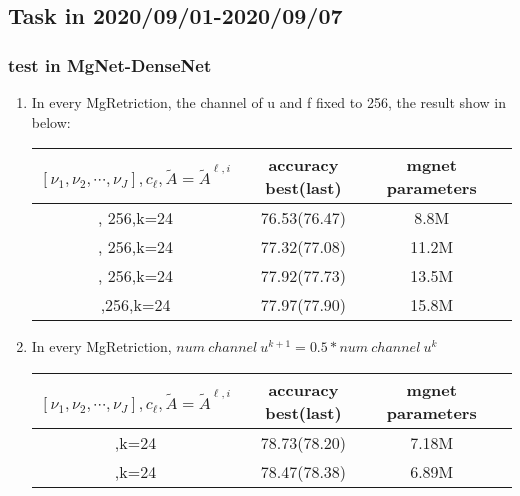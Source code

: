 \subsection{Task in 2020/09/01-2020/09/07}
\subsubsection{test in MgNet-DenseNet}
\begin{enumerate}
\item In every MgRetriction, the channel of u and f fixed to 256, the result show in below:
\begin{table}[!htbp]
	\begin{center}
			\begin{tabular}{|c|c|c|c|}
                \hline
				$[\nu_1,\nu_2,\cdots,\nu_J], c_\ell,\widetilde{A}=\widetilde{A}^{\ell,i}$   &  accuracy best(last)  & mgnet parameters \tabularnewline
				\hline
				[4,4,4,4], 256,k=24                         &  76.53(76.47)         &     8.8M         \tabularnewline
				\hline
				[6,6,6,6], 256,k=24                         &  77.32(77.08)         &     11.2M        \tabularnewline
				\hline		
				[8,8,8,8], 256,k=24                         &  77.92(77.73)         &     13.5M        \tabularnewline
				\hline
                [10,10,10,10],256,k=24                      &  77.97(77.90)         &     15.8M        \tabularnewline
				\hline
			\end{tabular}
	\end{center}
\end{table}
\item In every MgRetriction, $num~channel~u^{k+1} = 0.5*num~channel~u^k$
\begin{table}[!htbp]
	\begin{center}
			\begin{tabular}{|c|c|c|c|}
                \hline
				$[\nu_1,\nu_2,\cdots,\nu_J], c_\ell,\widetilde{A}=\widetilde{A}^{\ell,i}$   &  accuracy best(last)  & mgnet parameters \tabularnewline
				\hline		
				[8,8,8,8],k=24                         &  78.73(78.20)         &     7.18M        \tabularnewline
				\hline
                [10,10,10],k=24                        &  78.47(78.38)        &     6.89M        \tabularnewline
				\hline
			\end{tabular}
	\end{center}
\end{table}
\end{enumerate}


